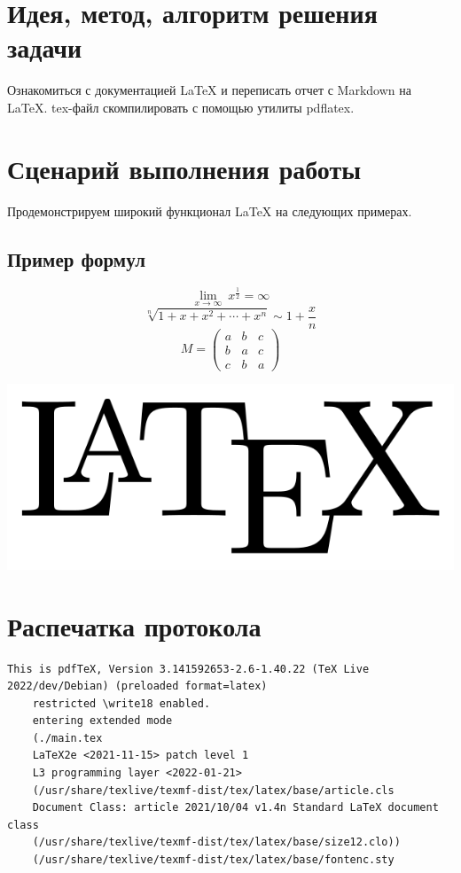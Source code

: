 \documentclass[12pt, letterpaper]{article}
\begin{document}
\section{Идея, метод, алгоритм решения задачи}
Ознакомиться с документацией \LaTeX{} и переписать отчет с Markdown на \LaTeX{}. tex-файл скомпилировать с помощью утилиты pdflatex.
\section{Сценарий выполнения работы}
Продемонстрируем широкий функционал \LaTeX{} на следующих примерах.
\subsection{Пример формул}
\[
\lim\limits_{x \to \infty} \ x^\frac{1}{2} = \infty
\]
\[
\sqrt[n]{1 + x + x^2 + \cdots + x^n} \sim 1 + \frac{x}{n}
\]
\[M=
\begin{pmatrix}
a & b & c\\
b & a & c\\
c & b & a
\end{pmatrix}\]
\begin{center}
\begin{tcolorbox}
\begin{center}
\includegraphics[width=0.6\linewidth]{latex.png}
\end{center}
\end{tcolorbox}
\end{center}
\section{Распечатка протокола}
\begin{lstlisting}[breaklines]
    This is pdfTeX, Version 3.141592653-2.6-1.40.22 (TeX Live 2022/dev/Debian) (preloaded format=latex)
    restricted \write18 enabled.
    entering extended mode
    (./main.tex
    LaTeX2e <2021-11-15> patch level 1
    L3 programming layer <2022-01-21>
    (/usr/share/texlive/texmf-dist/tex/latex/base/article.cls
    Document Class: article 2021/10/04 v1.4n Standard LaTeX document class
    (/usr/share/texlive/texmf-dist/tex/latex/base/size12.clo))
    (/usr/share/texlive/texmf-dist/tex/latex/base/fontenc.sty
\end{lstlisting}
\end{document}
